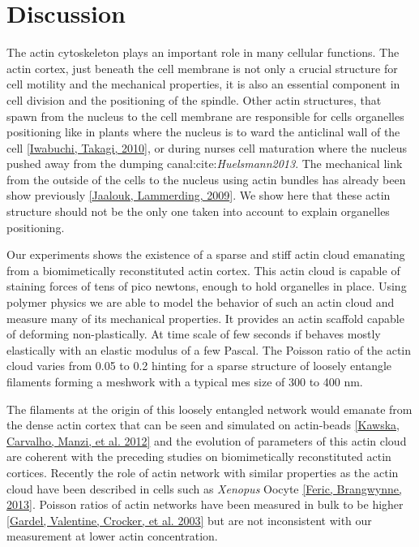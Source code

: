 \documentclass[A4paperpaper,11pt,english]{sphinxmanual}
\begin{document}
\section{Discussion}
\label{parts/part3:discussion}
The actin cytoskeleton plays an important role in many cellular functions.  The
actin cortex, just beneath the cell membrane is not only a crucial structure
for cell motility and the mechanical properties, it is also an essential
component in cell division and the positioning of the spindle.
Other actin structures, that spawn from the nucleus to the cell membrane are
responsible for cells organelles positioning like in plants where the nucleus is
to ward the anticlinal wall of the cell {\hyperref[parts/part3:iwabuchi2010]{{[}Iwabuchi, Takagi,  2010{]}}}, or during
nurses cell maturation where the nucleus pushed away from the dumping canal:cite:\emph{Huelsmann2013}. The mechanical link from the
outside of the cells to the nucleus using actin bundles has already been show previously
{\hyperref[parts/part3:jaalouk2009]{{[}Jaalouk, Lammerding,  2009{]}}}. We show here that these actin structure should not be the
only one taken into account to explain organelles positioning.

Our experiments shows the existence of a sparse and stiff actin cloud emanating
from a biomimetically reconstituted actin cortex.  This actin cloud is capable
of staining forces of
tens of pico newtons, enough to hold organelles in place. Using polymer physics
we are able to model the behavior of such an actin cloud and
measure many of its mechanical properties. It provides an
actin scaffold capable of deforming non-plastically. At time scale of few
seconds if behaves mostly elastically with an elastic modulus of a few Pascal.
The Poisson ratio of the actin cloud varies from 0.05 to 0.2 hinting for a
sparse structure of loosely entangle filaments forming a meshwork with a
typical mes size of 300 to 400 nm.

The filaments at the origin of this loosely entangled network would emanate from
the dense actin cortex that can be seen and simulated on actin-beads
{\hyperref[parts/part3:kawska2012]{{[}Kawska, Carvalho, Manzi,  et al.  2012{]}}} and the evolution of parameters of this actin cloud are
coherent with the preceding studies on biomimetically reconstituted actin
cortices. Recently the role of actin network with similar properties as the
actin cloud have been described in cells such as \emph{Xenopus} Oocyte
{\hyperref[parts/part3:feric2013]{{[}Feric, Brangwynne,  2013{]}}}. Poisson ratios of actin networks have been
measured in bulk to be higher {\hyperref[parts/part3:gardel2003]{{[}Gardel, Valentine, Crocker,  et al.  2003{]}}} but are not inconsistent with our measurement at lower actin concentration.
\end{document}

